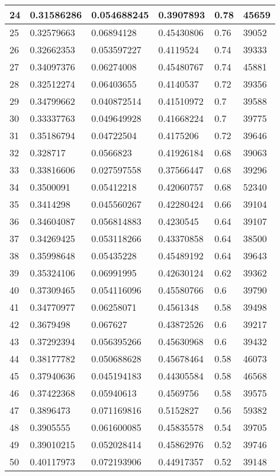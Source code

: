 \begin{longtable}{|l|l|l|l|l|l|}
24 & 0.31586286 & 0.054688245 & 0.3907893 & 0.78 & 45659 \\ \hline 
25 & 0.32579663 & 0.06894128 & 0.45430806 & 0.76 & 39052 \\ \hline 
26 & 0.32662353 & 0.053597227 & 0.4119524 & 0.74 & 39333 \\ \hline 
27 & 0.34097376 & 0.06274008 & 0.45480767 & 0.74 & 45881 \\ \hline 
28 & 0.32512274 & 0.06403655 & 0.4140537 & 0.72 & 39356 \\ \hline 
29 & 0.34799662 & 0.040872514 & 0.41510972 & 0.7 & 39588 \\ \hline 
30 & 0.33337763 & 0.049649928 & 0.41668224 & 0.7 & 39775 \\ \hline 
31 & 0.35186794 & 0.04722504 & 0.4175206 & 0.72 & 39646 \\ \hline 
32 & 0.328717 & 0.0566823 & 0.41926184 & 0.68 & 39063 \\ \hline 
33 & 0.33816606 & 0.027597558 & 0.37566447 & 0.68 & 39296 \\ \hline 
34 & 0.3500091 & 0.05412218 & 0.42060757 & 0.68 & 52340 \\ \hline 
35 & 0.3414298 & 0.045560267 & 0.42280424 & 0.66 & 39104 \\ \hline 
36 & 0.34604087 & 0.056814883 & 0.4230545 & 0.64 & 39107 \\ \hline 
37 & 0.34269425 & 0.053118266 & 0.43370858 & 0.64 & 38500 \\ \hline 
38 & 0.35998648 & 0.05435228 & 0.45489192 & 0.64 & 39643 \\ \hline 
39 & 0.35324106 & 0.06991995 & 0.42630124 & 0.62 & 39362 \\ \hline 
40 & 0.37309465 & 0.054116096 & 0.45580766 & 0.6 & 39790 \\ \hline 
41 & 0.34770977 & 0.06258071 & 0.4561348 & 0.58 & 39498 \\ \hline 
42 & 0.3679498 & 0.067627 & 0.43872526 & 0.6 & 39217 \\ \hline 
43 & 0.37292394 & 0.056395266 & 0.45630968 & 0.6 & 39432 \\ \hline 
44 & 0.38177782 & 0.050688628 & 0.45678464 & 0.58 & 46073 \\ \hline 
45 & 0.37940636 & 0.045194183 & 0.44305584 & 0.58 & 46568 \\ \hline 
46 & 0.37422368 & 0.05940613 & 0.4569756 & 0.58 & 39575 \\ \hline 
47 & 0.3896473 & 0.071169816 & 0.5152827 & 0.56 & 59382 \\ \hline 
48 & 0.3905555 & 0.061600085 & 0.45835578 & 0.54 & 39705 \\ \hline 
49 & 0.39010215 & 0.052028414 & 0.45862976 & 0.52 & 39746 \\ \hline 
50 & 0.40117973 & 0.072193906 & 0.44917357 & 0.52 & 39148 \\ \hline 
\end{longtable}